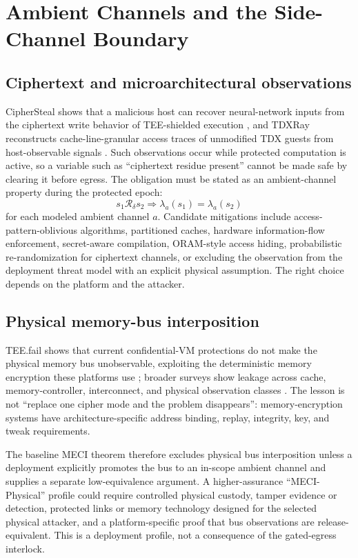 \documentclass[11pt,letterpaper]{article}
\theoremstyle{plain}
\theoremstyle{definition}
\newcommand{\Rd}{\mathrel{\mathcal{R}_\delta}}
\begin{document}
\section{Ambient Channels and the Side-Channel Boundary}\label{sec:ambient}

\subsection{Ciphertext and microarchitectural observations}
CipherSteal shows that a malicious host can recover neural-network inputs from the ciphertext write behavior of TEE-shielded execution \cite{ciphersteal}, and TDXRay reconstructs cache-line-granular access traces of unmodified TDX guests from host-observable signals \cite{tdxray}. Such observations occur while protected computation is active, so a variable such as ``ciphertext residue present'' cannot be made safe by clearing it before egress. The obligation must be stated as an ambient-channel property during the protected epoch:
\begin{equation}
s_1 \Rd s_2 \Rightarrow \lambda_a(s_1) = \lambda_a(s_2)
\end{equation}
for each modeled ambient channel $a$. Candidate mitigations include access-pattern-oblivious algorithms, partitioned caches, hardware information-flow enforcement, secret-aware compilation, ORAM-style access hiding, probabilistic re-randomization for ciphertext channels, or excluding the observation from the deployment threat model with an explicit physical assumption. The right choice depends on the platform and the attacker.

\subsection{Physical memory-bus interposition}
TEE.fail shows that current confidential-VM protections do not make the physical memory bus unobservable, exploiting the deterministic memory encryption these platforms use \cite{teefail}; broader surveys show leakage across cache, memory-controller, interconnect, and physical observation classes \cite{hassan2025}. The lesson is not ``replace one cipher mode and the problem disappears'': memory-encryption systems have architecture-specific address binding, replay, integrity, key, and tweak requirements.

The baseline MECI theorem therefore excludes physical bus interposition unless a deployment explicitly promotes the bus to an in-scope ambient channel and supplies a separate low-equivalence argument. A higher-assurance ``MECI-Physical'' profile could require controlled physical custody, tamper evidence or detection, protected links or memory technology designed for the selected physical attacker, and a platform-specific proof that bus observations are release-equivalent. This is a deployment profile, not a consequence of the gated-egress interlock.
\end{document}
